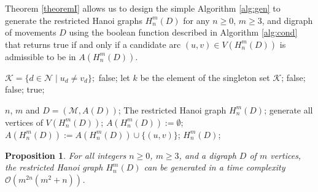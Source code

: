 \documentclass[10pt,a4paper]{amsart}
\newtheorem{proposition}{Proposition}
\begin{document}
Theorem \ref{theoremI} allows us to design the simple Algorithm \ref{alg:gen} to generate the restricted Hanoi graphs  $H_{n}^{m}(D)$ for any $n\geq 0$, $m\geq 3$, and digraph of movements $D$ using the boolean function described in Algorithm \ref{alg:cond} that returns true if and only if a candidate arc $(u,v)\in V(H_{n}^{m}(D))$ is admissible to be in  $A(H_{n}^{m}(D))$. 
\begin{algorithm}[H]
		\caption{A boolean function to decide whether an arc is in $H_{n}^{m}(D)$ or not }\label{alg:cond}
		\begin{algorithmic}[1]
                \State $\mathcal{K}=\{d\in\mathcal{N}\mid u_{d}\neq v_{d}\};$
                \State \Return false;
                \EndIf
                \State let $k$ be the  element of the singleton set $\mathcal{K}$;
                \State \Return false;
                \EndIf
                \State \Return false;
                \EndIf
                \EndFor
                \EndIf
                \State \Return true;
			\EndFunction
		\end{algorithmic}
	\end{algorithm}
	\begin{algorithm}[H]
		\caption{The restricted Hanoi graphs generator }\label{alg:gen}
		\begin{algorithmic}[1]
			\Require $n$, $m$ and $D=(\mathcal{M},A(D))$;
                \Ensure The restricted Hanoi graph $H_{n}^{m}(D)$;
                \State generate all vertices of $V(H_{n}^{m}(D))$;
                \State  $A(H_{n}^{m}(D)):=\emptyset$;
                \State $A(H_{n}^{m}(D)):=A(H_{n}^{m}(D))\cup\{(u,v)\}$;
                \EndIf
                \EndFor 
                \State \Return $H_{n}^{m}(D)$;
		\end{algorithmic}
	\end{algorithm}

\begin{proposition}
     For all integers $n\geq0$, $m\geq 3$, and a digraph $D$ of $m$ vertices, the restricted Hanoi graph $H_{n}^{m}(D)$ can be generated  in a time complexity $\mathcal{O}(m^{2n}(m^{2}+n))$.
\end{proposition}
\end{document}
